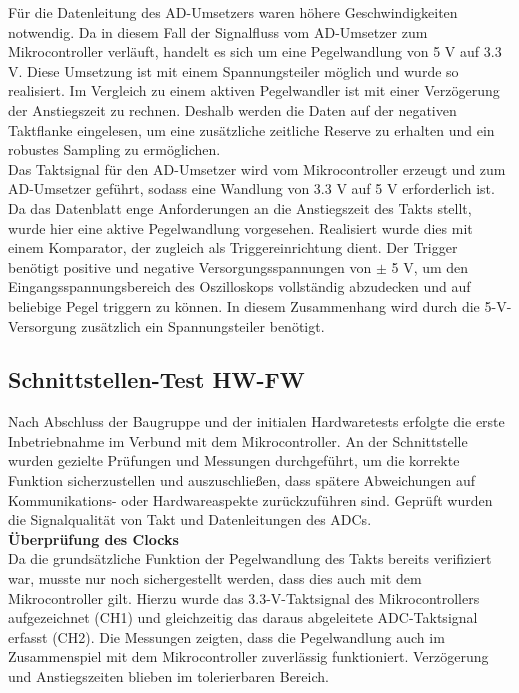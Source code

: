 \documentclass[a4paper, portrait, 12pt]{scrartcl} %
\begin{document}
Für die Datenleitung des AD-Umsetzers waren höhere Geschwindigkeiten notwendig. Da in diesem Fall der Signalfluss vom AD-Umsetzer zum Mikrocontroller verläuft, handelt es sich um eine Pegelwandlung von 5 V auf 3.3 V. Diese Umsetzung ist mit einem Spannungsteiler möglich und wurde so realisiert. Im Vergleich zu einem aktiven Pegelwandler ist mit einer Verzögerung der Anstiegszeit zu rechnen. Deshalb werden die Daten auf der negativen Taktflanke eingelesen, um eine zusätzliche zeitliche Reserve zu erhalten und ein robustes Sampling zu ermöglichen.\\ 

Das Taktsignal für den AD-Umsetzer wird vom Mikrocontroller erzeugt und zum AD-Umsetzer geführt, sodass eine Wandlung von 3.3 V auf 5 V erforderlich ist. Da das Datenblatt enge Anforderungen an die Anstiegszeit des Takts stellt, wurde hier eine aktive Pegelwandlung vorgesehen. Realisiert wurde dies mit einem Komparator, der zugleich als Triggereinrichtung dient. Der Trigger benötigt positive und negative Versorgungsspannungen von $\pm$ 5 V, um den Eingangsspannungsbereich des Oszilloskops vollständig abzudecken und auf beliebige Pegel triggern zu können. In diesem Zusammenhang wird durch die 5-V-Versorgung zusätzlich ein Spannungsteiler benötigt.\\ 


\subsection{Schnittstellen-Test HW-FW}
Nach Abschluss der Baugruppe und der initialen Hardwaretests erfolgte die erste Inbetriebnahme im Verbund mit dem Mikrocontroller. An der Schnittstelle wurden gezielte Prüfungen und Messungen durchgeführt, um die korrekte Funktion sicherzustellen und auszuschließen, dass spätere Abweichungen auf Kommunikations- oder Hardwareaspekte zurückzuführen sind. Geprüft wurden die Signalqualität von Takt und Datenleitungen des ADCs.\\ 

\textbf{Überprüfung des Clocks}\\ 

Da die grundsätzliche Funktion der Pegelwandlung des Takts bereits verifiziert war, musste nur noch sichergestellt werden, dass dies auch mit dem Mikrocontroller gilt. Hierzu wurde das 3.3-V-Taktsignal des Mikrocontrollers aufgezeichnet (CH1) und gleichzeitig das daraus abgeleitete ADC-Taktsignal erfasst (CH2). Die Messungen zeigten, dass die Pegelwandlung auch im Zusammenspiel mit dem Mikrocontroller zuverlässig funktioniert. Verzögerung und Anstiegszeiten blieben im tolerierbaren Bereich.\\
\end{document}
